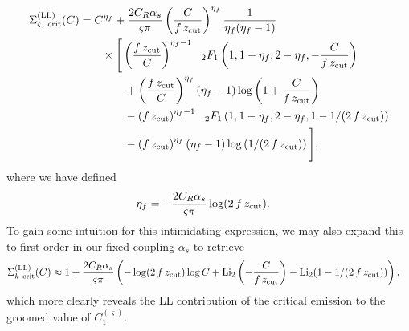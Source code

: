 \begin{equation}
\begin{aligned}
    \Sigma^{\rm(LL)}_{\varsigma,~{\rm crit}} (C)
    &=
    C^{\eta_f}
    + \frac{2C_R\alpha_s}
    {\varsigma \pi}
    \left(
        \frac{C}{f\,z_{\rm cut}}
    \right)
    ^{\eta_f}
    \frac{1}{\eta_f(\eta_f-1)}
    \\
    &~~~~~~
    \times
    \Bigg[
        \left(
        \frac{f\,z_{\rm cut}}{C}
        \right)
        ^{\eta_f - 1}
        {}_{~~2}F_1
        \left(
            1, 1-\eta_f, 2-\eta_f,
            -\frac{C}{f\,z_{\rm cut}}
        \right)
        \\
        &~~~~~~~~~~~~
        +
        \left(
        \frac{f\,z_{\rm cut}}{C}
        \right)
        ^{\eta_f}
        \left(\eta_f-1\right)
        \log\left(
        1 + \frac{C} {f\,z_{\rm cut}}
        \right)
        \\
        &~~~~~~~~~~~~
        -\left(f\,z_{\rm cut}\right)
        ^{\eta_f - 1}
        {}_{~~2}F_1
        \left(
            1,1-\eta_f,2-\eta_f,
            1-1/(2\,f\,z_{\rm cut})
        \right)
        \\
        &~~~~~~~~~~~~
        -
        \left(f\,z_{\rm cut}\right)
        ^{\eta_f}
        \left(\eta_f-1\right)
        \log\left(1/(2\,f\,z_{\rm cut})\right)
    \Bigg]
    ,
    \label{eqn:ECF_LL}
\end{aligned}
\end{equation}
%
where we have defined
\begin{align}
    \eta_f
    &=
    -\frac{2 C_R \alpha_s}{\varsigma \pi}
    \log(2\,f\,z_{\rm cut})
    .
\end{align}
%
To gain some intuition for this intimidating expression, we may also expand this to first order in our fixed coupling \(\alpha_s\) to retrieve
%
\begin{equation}
\begin{aligned}
    \Sigma^{\rm(LL)}_{k~{\rm crit}} (C)
    &\approx
    1 + \frac{2 C_R \alpha_s} {\varsigma \pi}
    \left(
        -\log(2\,f\,z_{\rm cut})
        \log C
        +
        {\rm Li}_2
        \left(
        -\frac{C}{f\,z_{\rm cut}}
        \right)
        -
        {\rm Li}_2(1 - 1/(2\,f\,z_{\rm cut}))
    \right)
    ,
    \label{eqn:convolDistExpansion}
\end{aligned}
\end{equation}
%
which more clearly reveals the LL contribution of the critical emission to the groomed value of \(C_1^{(\varsigma)}\).

